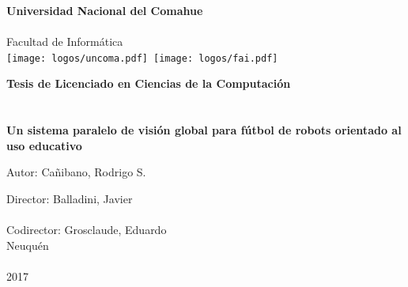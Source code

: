 
\titlepage

\begin{center}
\ \\
\ \\
\vspace{-1cm}


\ \\

\vspace{0.5cm}
{\Large{\bf \sc Universidad Nacional del Comahue}}\\

\ \\
{\Large { \sc Facultad de Informática}}\\

\vspace{-2.5cm}
\mbox{\hspace{-1cm}\texttt{[image: logos/uncoma.pdf]}\hspace{13cm} \texttt{[image: logos/fai.pdf]}}


\vspace{6cm}

{\Large {\bf\sc Tesis de Licenciado en Ciencias de la Computación}}\\
\ \\
\ \\
{\LARGE {\bf Un sistema paralelo de visión global para fútbol de robots
	orientado al uso educativo}}\\
\vspace{3cm}

{\Large Autor: Cañibano, Rodrigo S.}\\
\vspace{2cm}

{\Large Director: Balladini, Javier}\\
\ \\
{\Large Codirector: Grosclaude, Eduardo}\\

\vfill
{\Large {\sc Neuquén}\hspace{6cm}{\sc Argentina}}\\
\ \\

{\Large 2017}\\

\end{center}

\pagebreak

